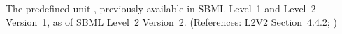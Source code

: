 The predefined unit , previously available in SBML Level~1 and
Level~2 Version~1,  as of SBML Level~2 Version~2.  (References: L2V2 Section~4.4.2;
)
